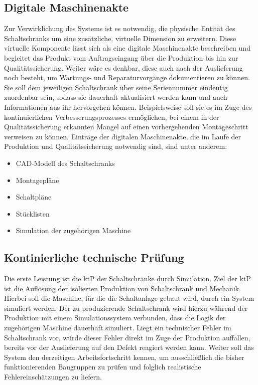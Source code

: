 \documentclass[
    type=Projektarbeit,
    status=draft, %
    language=german, %
    bibengine=bibtex,
]{unibwm-inf-thesis}
\begin{document}
    \subsection{Digitale Maschinenakte}\label{subsec:digitale-maschinenakte}
    Zur Verwirklichung des Systems ist es notwendig, die physische Entität des Schaltschranks um eine zusätzliche,
    virtuelle Dimension zu erweitern.
    Diese virtuelle Komponente lässt sich als eine digitale Maschinenakte beschreiben und begleitet das Produkt vom
    Auftragseingang über die Produktion
    bis hin zur Qualitätssicherung.
    Weiter wäre es denkbar, diese auch nach der Auslieferung noch besteht, um Wartungs- und Reparaturvorgänge
    dokumentieren zu können.
    Sie soll dem jeweiligen Schaltschrank über seine Seriennummer eindeutig zuordenbar sein, sodass sie dauerhaft
    aktualisiert werden kann und auch Informationen aus ihr hervorgehen können.
    Beispielsweise soll sie es im Zuge des kontinuierlichen Verbesserungsprozesses ermöglichen, bei einem in der
    Qualitätssicherung erkannten Mangel auf einen vorhergehenden Montageschritt verweisen zu können.
    Einträge der digitalen Maschinenakte, die im Laufe der Produktion und Qualitätssicherung notwendig sind, sind unter
    anderem:
    \begin{itemize}
        \item CAD-Modell des Schaltschranks
        \item Montagepläne
        \item Schaltpläne
        \item Stücklisten
        \item Simulation der zugehörigen Maschine
    \end{itemize}



    \subsection{Kontinierliche technische Prüfung}\label{subsec:kontinierliche-technische-prufung}
    Die erste Leistung ist die \ac{ktP} der Schaltschränke durch Simulation.
    Ziel der \ac{ktP} ist die Auflösung der isolierten Produktion von Schaltschrank und Mechanik.
    Hierbei soll die Maschine, für die die Schaltanlage gebaut wird, durch ein System simuliert werden.
    Der zu produzierende Schaltschrank wird hierzu während der Produktion mit einem Simulationssystem verbunden, dass die Logik der zugehörigen Maschine dauerhaft simuliert.
    Liegt ein technischer Fehler im Schaltschrank vor, würde dieser Fehler direkt im Zuge der Produktion auffallen, bereits vor der Auslieferung auf den Defekt reagiert werden kann.
    Weiter soll das System den derzeitigen Arbeitsfortschritt kennen, um ausschließlich die bisher funktionierenden Baugruppen zu prüfen und folglich realistische Fehlereinschätzungen zu liefern.
\end{document}
